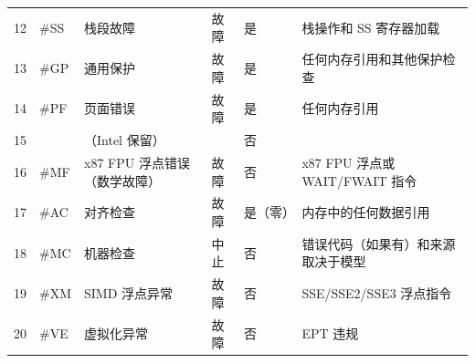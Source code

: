 \begin{longtable}[c]{@{}llllll@{}}
    12          & \#SS         & 栈段故障                                                                                                                                                   & 故障          & 是             & 栈操作和 SS 寄存器加载                 \\
    13          & \#GP         & 通用保护                                                                                                                                                   & 故障          & 是             & 任何内存引用和其他保护检查                 \\
    14          & \#PF         & 页面错误                                                                                                                                                   & 故障          & 是             & 任何内存引用                        \\
    15          &              & （Intel 保留）                                                                                                                                             &             & 否             &                               \\
    16          & \#MF         & x87 FPU 浮点错误（数学故障）                                                                                                                                     & 故障          & 否             & x87 FPU 浮点或 WAIT/FWAIT 指令     \\
    17          & \#AC         & 对齐检查                                                                                                                                                   & 故障          & 是（零）          & 内存中的任何数据引用                    \\
    18          & \#MC         & 机器检查                                                                                                                                                   & 中止          & 否             & 错误代码（如果有）和来源取决于模型             \\
    19          & \#XM         & SIMD 浮点异常                                                                                                                                              & 故障          & 否             & SSE/SSE2/SSE3 浮点指令            \\
    20          & \#VE         & 虚拟化异常                                                                                                                                                  & 故障          & 否             & EPT 违规                        \\

\end{longtable}
